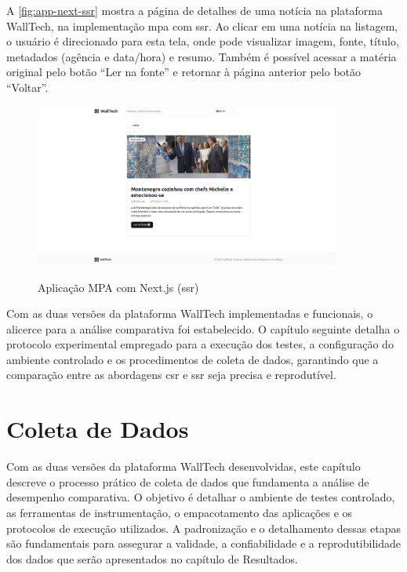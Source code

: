 A \autoref{fig:app-next-ssr} mostra a página de detalhes de uma notícia na plataforma WallTech, na implementação \acrshort{mpa} com \acrshort{ssr}. Ao clicar em uma notícia na listagem, o usuário é direcionado para esta tela, onde pode visualizar imagem, fonte, título, metadados (agência e data/hora) e resumo. Também é possível acessar a matéria original pelo botão “Ler na fonte” e retornar à página anterior pelo botão “Voltar”.

\begin{figure}[H]
  \centering
  \caption{Aplicação MPA com Next.js (\acrshort{ssr})}
  \includegraphics[width=0.9\textwidth]{media/app_next_ssr.png}
  \label{fig:app-next-ssr}
\end{figure}



\vspace{1cm}
Com as duas versões da plataforma WallTech implementadas e funcionais, o alicerce para a análise comparativa foi estabelecido. O capítulo seguinte detalha o protocolo experimental empregado para a execução dos testes, a configuração do ambiente controlado e os procedimentos de coleta de dados, garantindo que a comparação entre as abordagens \acrshort{csr} e \acrshort{ssr} seja precisa e reprodutível.



\chapter{Coleta de Dados}
\label{cap:metodologia_experimental}


Com as duas versões da plataforma WallTech desenvolvidas, este capítulo descreve o processo prático de coleta de dados que fundamenta a análise de desempenho comparativa. O objetivo é detalhar o ambiente de testes controlado, as ferramentas de instrumentação, o empacotamento das aplicações e os protocolos de execução utilizados. A padronização e o detalhamento dessas etapas são fundamentais para assegurar a validade, a confiabilidade e a reprodutibilidade dos dados que serão apresentados no capítulo de Resultados.



